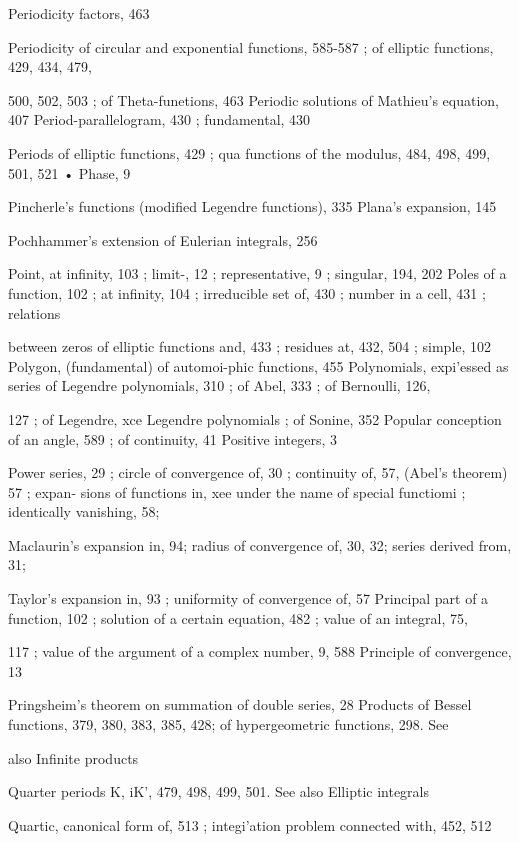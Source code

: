 %
%
Periodicity factors, 463

Periodicity of circular and exponential functions, 585-587 ; of elliptic functions, 429, 434, 479,

500, 502, 503 ; of Theta-funetions, 463
Periodic solutions of Mathieu's equation, 407
Period-parallelogram, 430 ; fundamental, 430

Periods of elliptic functions, 429 ; qua functions of the modulus, 484, 498, 499, 501, 521 •
Phase, 9

Pincherle's functions (modified Legendre functions), 335
Plana's expansion, 145

Pochhammer's extension of Eulerian integrals, 256

Point, at infinity, 103 ; limit-, 12 ; representative, 9 ; singular, 194, 202
Poles of a function, 102 ; at infinity, 104 ; irreducible set of, 430 ; number in a cell, 431 ; relations

between zeros of elliptic functions and, 433 ; residues at, 432, 504 ; simple, 102
Polygon, (fundamental) of automoi-phic functions, 455
Polynomials, expi'essed as series of Legendre polynomials, 310 ; of Abel, 333 ; of Bernoulli, 126,

127 ; of Legendre, xce Legendre polynomials ; of Sonine, 352
Popular conception of an angle, 589 ; of continuity, 41
Positive integers, 3

Power series, 29 ; circle of convergence of, 30 ; continuity of, 57, (Abel's theorem) 57 ; expan-
sions of functions in, xee under the name  of special functiomi ; identically vanishing, 58;

Maclaurin's expansion in, 94; radius of convergence of, 30, 32; series derived from, 31;

Taylor's expansion in, 93 ; uniformity of convergence of, 57
Principal part of a function, 102 ; solution of a certain equation, 482 ; value of an integral, 75,

117 ; value of the argument of a complex number, 9, 588
Principle of convergence, 13

Pringsheim's theorem on summation of double series, 28
Products of Bessel functions, 379, 380, 383, 385, 428; of hypergeometric functions, 298. See

also Infinite products

Quarter periods K, iK', 479, 498, 499, 501. See also Elliptic integrals

Quartic, canonical form of, 513 ; integi'ation problem connected with, 452, 512

